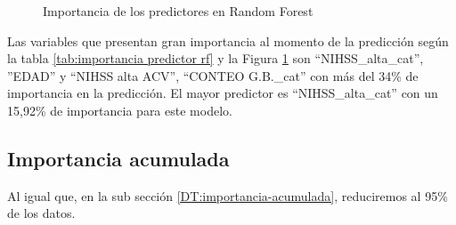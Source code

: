    \begin{center}
    	\begin{figure}[H]
	\centering
	\caption{Importancia de los predictores en Random Forest}
	\label{fig:iprf}
	\end{figure}
\end{center}

    Las variables que presentan gran importancia al momento de la predicción según la tabla \ref{tab:importancia predictor rf} y la Figura \ref{fig:iprf} son ``NIHSS\_alta\_cat'', ''EDAD'' y ``NIHSS alta ACV'', ``CONTEO G.B.\_cat'' con más del 34\% de importancia en la predicción. El mayor predictor es ``NIHSS\_alta\_cat'' con un 15,92\% de importancia para este modelo.\\
    

    \hypertarget{importancia-acumulada}{%
\subsection{Importancia acumulada}\label{importancia-acumulada}}

	Al igual que, en la sub sección \ref{DT:importancia-acumulada}, reduciremos al 95\% de los datos.

